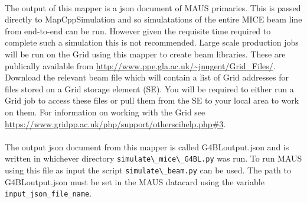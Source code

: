 \paragraph{}

The output of this mapper is a json document of MAUS primaries. This is passed directly to MapCppSimulation and so simulatations of the entire MICE beam line from end-to-end can be run. However given the requisite time required to complete such a simulation this is not recommended. Large scale production jobs will be run on the Grid using this mapper to create beam libraries. These are publically available from \url{http://www.ppe.gla.ac.uk/~jnugent/Grid_Files/}. Download the relevant beam file which will contain a list of Grid addresses for files stored on a Grid storage element (SE). You will be required to either run a Grid job to access these files or pull them from the SE to your local area to work on them. For information on working with the Grid see \url{https://www.gridpp.ac.uk/php/support/otherscihelp.php#3}.  

\paragraph{}

The output json document from this mapper is called G4BLoutput.json and is  written in whichever directory \verb+simulate\_mice\_G4BL.py+ was run. To run MAUS using this file as input the script \verb+simulate\_beam.py+ can be used. The path to G4BLoutput.json must be set in the MAUS datacard using the variable \verb+input_json_file_name+. 



















